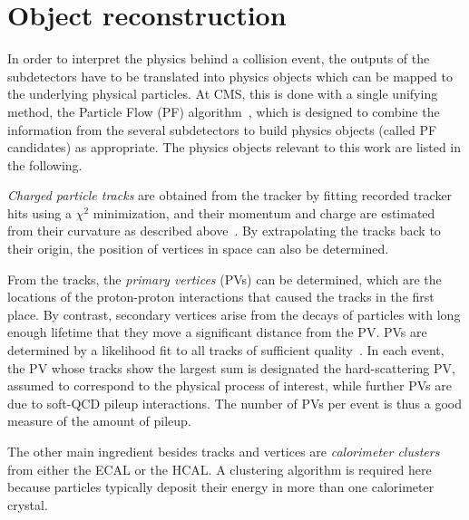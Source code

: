 \section{Object reconstruction}
\label{sec:methods:reco}

In order to interpret the physics behind a collision event, the outputs of the subdetectors have to be translated into physics objects which can be mapped to the underlying physical particles. At CMS, this is done with a single unifying method, the Particle Flow (PF) algorithm~\cite{CMS:PRF-14-001}, which is designed to combine the information from the several subdetectors to build physics objects (called PF candidates) as appropriate. The physics objects relevant to this work are listed in the following.

\textit{Charged particle tracks} are obtained from the tracker by fitting recorded tracker hits using a $\chi^2$ minimization, and their momentum and charge are estimated from their curvature as described above~\cite{CMS:2014pgm}. 
By extrapolating the tracks back to their origin, the position of vertices in space can also be determined. 
    
From the tracks, the \textit{primary vertices} (PVs) can be determined, which are the locations of the proton-proton interactions that caused the tracks in the first place. By contrast, secondary vertices arise from the decays of particles with long enough lifetime that they move a significant distance from the PV. PVs are determined by a likelihood fit to all tracks of sufficient quality~\cite{CMS:2014pgm}. In each event, the PV whose tracks show the largest \pt sum is designated the hard-scattering PV, assumed to correspond to the physical process of interest, while further PVs are due to soft-QCD pileup interactions. The number of PVs per event is thus a good measure of the amount of pileup.
    
The other main ingredient besides tracks and vertices are \textit{calorimeter clusters} from either the ECAL or the HCAL. A clustering algorithm is required here because particles typically deposit their energy in more than one calorimeter crystal.

